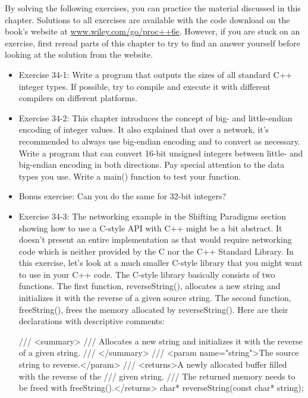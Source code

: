 By solving the following exercises, you can practice the material discussed in this chapter. Solutions to all exercises are available with the code download on the book’s website at \url{www.wiley.com/go/proc++6e}. However, if you are stuck on an exercise, first reread parts of this chapter to try to find an answer yourself before looking at the solution from the website.

\begin{itemize}
\item
Exercise 34-1: Write a program that outputs the sizes of all standard C++ integer types. If possible, try to compile and execute it with different compilers on different platforms.

\item
Exercise 34-2: This chapter introduces the concept of big- and little-endian encoding of integer values. It also explained that over a network, it’s recommended to always use big-endian encoding and to convert as necessary. Write a program that can convert 16-bit unsigned integers between little- and big-endian encoding in both directions. Pay special attention to the data types you use. Write a main() function to test your function.

\item
Bonus exercise: Can you do the same for 32-bit integers?

\item
Exercise 34-3: The networking example in the Shifting Paradigms section showing how to use a C-style API with C++ might be a bit abstract. It doesn’t present an entire implementation as that would require networking code which is neither provided by the C nor the C++ Standard Library. In this exercise, let’s look at a much smaller C-style library that you might want to use in your C++ code. The C-style library basically consists of two functions. The first function, reverseString(), allocates a new string and initializes it with the reverse of a given source string. The second function, freeString(), frees the memory allocated by reverseString(). Here are their declarations with descriptive comments:

\begin{cpp}
/// <summary>
/// Allocates a new string and initializes it with the reverse of a given string.
/// </summary>
/// <param name="string">The source string to reverse.</param>
/// <returns>A newly allocated buffer filled with the reverse of the
/// given string.
/// The returned memory needs to be freed with freeString().</returns>
char* reverseString(const char* string);


\end{cpp}
\end{itemize}
